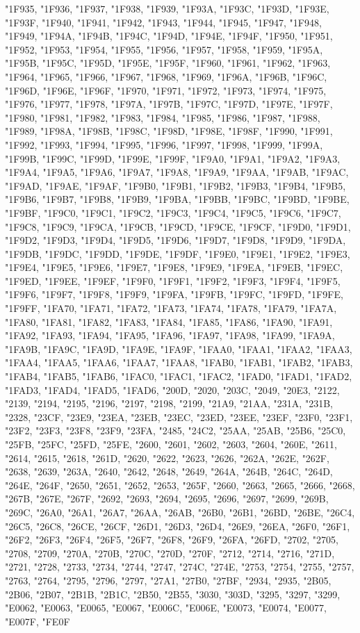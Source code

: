 {"1F935,
"1F936,
"1F937,
"1F938,
"1F939,
"1F93A,
"1F93C,
"1F93D,
"1F93E,
"1F93F,
"1F940,
"1F941,
"1F942,
"1F943,
"1F944,
"1F945,
"1F947,
"1F948,
"1F949,
"1F94A,
"1F94B,
"1F94C,
"1F94D,
"1F94E,
"1F94F,
"1F950,
"1F951,
"1F952,
"1F953,
"1F954,
"1F955,
"1F956,
"1F957,
"1F958,
"1F959,
"1F95A,
"1F95B,
"1F95C,
"1F95D,
"1F95E,
"1F95F,
"1F960,
"1F961,
"1F962,
"1F963,
"1F964,
"1F965,
"1F966,
"1F967,
"1F968,
"1F969,
"1F96A,
"1F96B,
"1F96C,
"1F96D,
"1F96E,
"1F96F,
"1F970,
"1F971,
"1F972,
"1F973,
"1F974,
"1F975,
"1F976,
"1F977,
"1F978,
"1F97A,
"1F97B,
"1F97C,
"1F97D,
"1F97E,
"1F97F,
"1F980,
"1F981,
"1F982,
"1F983,
"1F984,
"1F985,
"1F986,
"1F987,
"1F988,
"1F989,
"1F98A,
"1F98B,
"1F98C,
"1F98D,
"1F98E,
"1F98F,
"1F990,
"1F991,
"1F992,
"1F993,
"1F994,
"1F995,
"1F996,
"1F997,
"1F998,
"1F999,
"1F99A,
"1F99B,
"1F99C,
"1F99D,
"1F99E,
"1F99F,
"1F9A0,
"1F9A1,
"1F9A2,
"1F9A3,
"1F9A4,
"1F9A5,
"1F9A6,
"1F9A7,
"1F9A8,
"1F9A9,
"1F9AA,
"1F9AB,
"1F9AC,
"1F9AD,
"1F9AE,
"1F9AF,
"1F9B0,
"1F9B1,
"1F9B2,
"1F9B3,
"1F9B4,
"1F9B5,
"1F9B6,
"1F9B7,
"1F9B8,
"1F9B9,
"1F9BA,
"1F9BB,
"1F9BC,
"1F9BD,
"1F9BE,
"1F9BF,
"1F9C0,
"1F9C1,
"1F9C2,
"1F9C3,
"1F9C4,
"1F9C5,
"1F9C6,
"1F9C7,
"1F9C8,
"1F9C9,
"1F9CA,
"1F9CB,
"1F9CD,
"1F9CE,
"1F9CF,
"1F9D0,
"1F9D1,
"1F9D2,
"1F9D3,
"1F9D4,
"1F9D5,
"1F9D6,
"1F9D7,
"1F9D8,
"1F9D9,
"1F9DA,
"1F9DB,
"1F9DC,
"1F9DD,
"1F9DE,
"1F9DF,
"1F9E0,
"1F9E1,
"1F9E2,
"1F9E3,
"1F9E4,
"1F9E5,
"1F9E6,
"1F9E7,
"1F9E8,
"1F9E9,
"1F9EA,
"1F9EB,
"1F9EC,
"1F9ED,
"1F9EE,
"1F9EF,
"1F9F0,
"1F9F1,
"1F9F2,
"1F9F3,
"1F9F4,
"1F9F5,
"1F9F6,
"1F9F7,
"1F9F8,
"1F9F9,
"1F9FA,
"1F9FB,
"1F9FC,
"1F9FD,
"1F9FE,
"1F9FF,
"1FA70,
"1FA71,
"1FA72,
"1FA73,
"1FA74,
"1FA78,
"1FA79,
"1FA7A,
"1FA80,
"1FA81,
"1FA82,
"1FA83,
"1FA84,
"1FA85,
"1FA86,
"1FA90,
"1FA91,
"1FA92,
"1FA93,
"1FA94,
"1FA95,
"1FA96,
"1FA97,
"1FA98,
"1FA99,
"1FA9A,
"1FA9B,
"1FA9C,
"1FA9D,
"1FA9E,
"1FA9F,
"1FAA0,
"1FAA1,
"1FAA2,
"1FAA3,
"1FAA4,
"1FAA5,
"1FAA6,
"1FAA7,
"1FAA8,
"1FAB0,
"1FAB1,
"1FAB2,
"1FAB3,
"1FAB4,
"1FAB5,
"1FAB6,
"1FAC0,
"1FAC1,
"1FAC2,
"1FAD0,
"1FAD1,
"1FAD2,
"1FAD3,
"1FAD4,
"1FAD5,
"1FAD6,
"200D,
"2020,
"203C,
"2049,
"20E3,
"2122,
"2139,
"2194,
"2195,
"2196,
"2197,
"2198,
"2199,
"21A9,
"21AA,
"231A,
"231B,
"2328,
"23CF,
"23E9,
"23EA,
"23EB,
"23EC,
"23ED,
"23EE,
"23EF,
"23F0,
"23F1,
"23F2,
"23F3,
"23F8,
"23F9,
"23FA,
"2485,
"24C2,
"25AA,
"25AB,
"25B6,
"25C0,
"25FB,
"25FC,
"25FD,
"25FE,
"2600,
"2601,
"2602,
"2603,
"2604,
"260E,
"2611,
"2614,
"2615,
"2618,
"261D,
"2620,
"2622,
"2623,
"2626,
"262A,
"262E,
"262F,
"2638,
"2639,
"263A,
"2640,
"2642,
"2648,
"2649,
"264A,
"264B,
"264C,
"264D,
"264E,
"264F,
"2650,
"2651,
"2652,
"2653,
"265F,
"2660,
"2663,
"2665,
"2666,
"2668,
"267B,
"267E,
"267F,
"2692,
"2693,
"2694,
"2695,
"2696,
"2697,
"2699,
"269B,
"269C,
"26A0,
"26A1,
"26A7,
"26AA,
"26AB,
"26B0,
"26B1,
"26BD,
"26BE,
"26C4,
"26C5,
"26C8,
"26CE,
"26CF,
"26D1,
"26D3,
"26D4,
"26E9,
"26EA,
"26F0,
"26F1,
"26F2,
"26F3,
"26F4,
"26F5,
"26F7,
"26F8,
"26F9,
"26FA,
"26FD,
"2702,
"2705,
"2708,
"2709,
"270A,
"270B,
"270C,
"270D,
"270F,
"2712,
"2714,
"2716,
"271D,
"2721,
"2728,
"2733,
"2734,
"2744,
"2747,
"274C,
"274E,
"2753,
"2754,
"2755,
"2757,
"2763,
"2764,
"2795,
"2796,
"2797,
"27A1,
"27B0,
"27BF,
"2934,
"2935,
"2B05,
"2B06,
"2B07,
"2B1B,
"2B1C,
"2B50,
"2B55,
"3030,
"303D,
"3295,
"3297,
"3299,
"E0062,
"E0063,
"E0065,
"E0067,
"E006C,
"E006E,
"E0073,
"E0074,
"E0077,
"E007F,
"FE0F}

